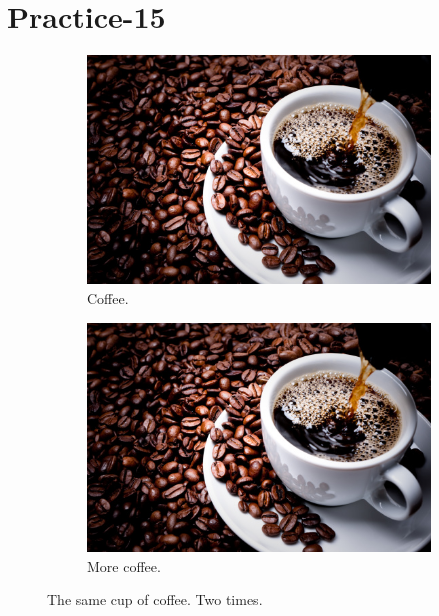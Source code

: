 \documentclass{article}
\begin{document}
\section{Practice-15}
	\begin{figure}[h!]
	\centering
	\begin{subfigure}[b]{0.4\linewidth}
		\includegraphics[width=\linewidth]{coffe.jpg}
		\caption{Coffee.}
	\end{subfigure}
	\begin{subfigure}[b]{0.4\linewidth}
		
		\includegraphics[width=\linewidth]{coffe.jpg}
		\caption{More coffee.}
	\end{subfigure}
	\caption{The same cup of coffee. Two times.}
	\label{fig:coffee}
\end{figure}
\end{document}
